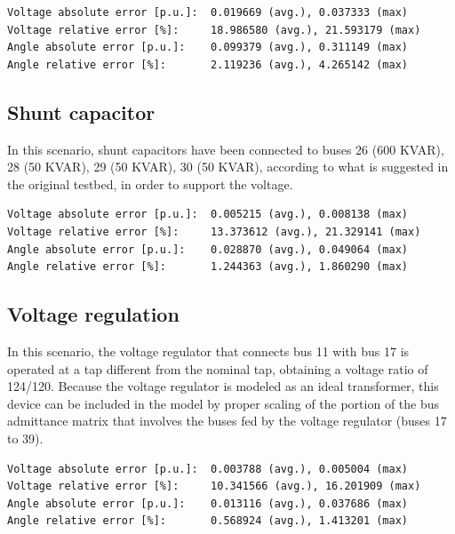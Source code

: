 \documentclass[10pt,letterpaper]{article}
\begin{document}
\begin{verbatim}
Voltage absolute error [p.u.]:  0.019669 (avg.), 0.037333 (max)
Voltage relative error [%]:     18.986580 (avg.), 21.593179 (max)
Angle absolute error [p.u.]:    0.099379 (avg.), 0.311149 (max)
Angle relative error [%]:       2.119236 (avg.), 4.265142 (max)
\end{verbatim}

\def\octavedatam{data/data_3_voltagem.data}
\def\octavedataa{data/data_3_voltagea.data}


\subsection{Shunt capacitor}
\label{sec:scenario4}

In this scenario, shunt capacitors have been connected to buses 26 (600 KVAR), 28 (50 KVAR), 29 (50 KVAR), 30 (50 KVAR), according to what is suggested in the original testbed, in order to support the voltage. 

\begin{verbatim}
Voltage absolute error [p.u.]:  0.005215 (avg.), 0.008138 (max)
Voltage relative error [%]:     13.373612 (avg.), 21.329141 (max)
Angle absolute error [p.u.]:    0.028870 (avg.), 0.049064 (max)
Angle relative error [%]:       1.244363 (avg.), 1.860290 (max)
\end{verbatim}

\def\octavedatam{data/data_4_voltagem.data}
\def\octavedataa{data/data_4_voltagea.data}


\subsection{Voltage regulation}

In this scenario, the voltage regulator that connects bus 11 with bus 17 is operated at a tap different from the nominal tap, obtaining a voltage ratio of 124/120. Because the voltage regulator is modeled as an ideal transformer, this device can be included in the model by proper scaling of the portion of the bus admittance matrix that involves the buses fed by the voltage regulator (buses 17 to 39).

\begin{verbatim}
Voltage absolute error [p.u.]:  0.003788 (avg.), 0.005004 (max)
Voltage relative error [%]:     10.341566 (avg.), 16.201909 (max)
Angle absolute error [p.u.]:    0.013116 (avg.), 0.037686 (max)
Angle relative error [%]:       0.568924 (avg.), 1.413201 (max)
\end{verbatim}
\end{document}
